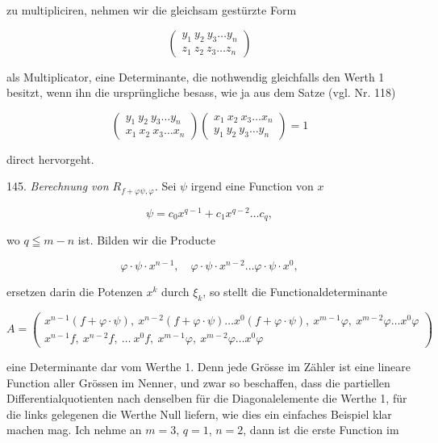 \documentclass[11pt]{article}
\providecommand{\weq}[2]{\begin{equation}\tag{#1}#2\end{equation}}
\begin{document}
zu multipliciren, nehmen wir die gleichsam gest\"urzte Form

\weq{2}{
\left(
\begin{array}{cc}
y_1\ y_2\ y_3 \ldots y_n \\
z_1\ z_2\ z_3 \ldots z_n
\end{array}
\right)
}

als Multiplicator, eine Determinante, die nothwendig gleichfalls den Werth 1 besitzt, wenn
ihn die urspr\"ungliche besass, wie ja aus dem Satze (vgl. Nr. 118)

\[
\left(
\begin{array}{cc}
y_1\ y_2\ y_3 \ldots y_n \\
x_1\ x_2\ x_3 \ldots x_n
\end{array}
\right)
\left(
\begin{array}{cc}
x_1\ x_2\ x_3 \ldots x_n \\
y_1\ y_2\ y_3 \ldots y_n
\end{array}
\right)
= 1
\]

direct hervorgeht.

145. \textit{Berechnung von $R_{f+\varphi\psi,\varphi}$.} Sei $\psi$ irgend eine Function
von $x$

\[ \psi = c_0x^{q-1} + c_1x^{q-2}\ldots c_q, \]

wo $q \leqq m-n$ ist. Bilden wir die Producte

\[ \varphi\cdot\psi\cdot x^{n-1},\quad \varphi\cdot\psi\cdot x^{n-2}\ldots \varphi\cdot\psi\cdot x^0, \]

ersetzen darin die Potenzen $x^k$ durch $\xi_k$, so stellt die Functionaldeterminante

\[
A =
\left(
\begin{array}{cc}
x^{n-1}(f+\varphi\cdot\psi),\ x^{n-2}(f+\varphi\cdot\psi)\ldots x^0(f+\varphi\cdot\psi),\ x^{m-1}\varphi,\ x^{m-2}\varphi\ldots x^0\varphi \\
x^{n-1}f,\ x^{n-2}f,\ \ldots\ x^0f,\ x^{m-1}\varphi,\ x^{m-2}\varphi\ldots x^0\varphi
\end{array}
\right)
\]

eine Determinante dar vom Werthe 1. Denn jede Gr\"osse im Z\"ahler ist eine lineare
Function aller Gr\"ossen im Nenner, und zwar so beschaffen, dass die partiellen
Differentialquotienten nach denselben f\"ur die Diagonalelemente die Werthe 1, f\"ur die
links gelegenen die Werthe Null liefern, wie dies ein einfaches Beispiel klar machen mag.
Ich nehme an $m=3$, $q=1$, $n=2$, dann ist die erste Function im
\end{document}
